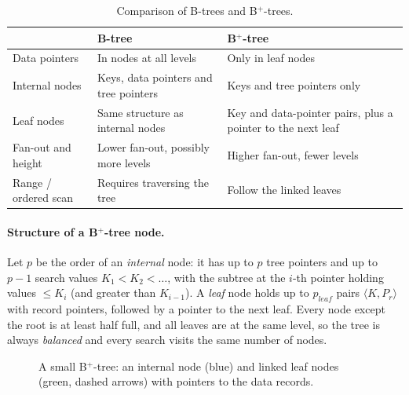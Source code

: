 \begin{table}[H]
\centering
\small
\begin{tabularx}{\textwidth}{@{}l>{\raggedright\arraybackslash}X>{\raggedright\arraybackslash}X@{}}
\toprule
 & \textbf{B-tree} & \textbf{B$^+$-tree} \\
\midrule
Data pointers & In nodes at all levels & Only in leaf nodes \\
Internal nodes & Keys, data pointers and tree pointers & Keys and tree pointers only \\
Leaf nodes & Same structure as internal nodes & Key and data-pointer pairs, plus a pointer to the next leaf \\
Fan-out and height & Lower fan-out, possibly more levels & Higher fan-out, fewer levels \\
Range / ordered scan & Requires traversing the tree & Follow the linked leaves \\
\bottomrule
\end{tabularx}
\caption{Comparison of B-trees and B$^+$-trees.}
\label{tab:btree-vs-bplus}
\end{table}

\paragraph{Structure of a B$^+$-tree node.}
Let $p$ be the order of an \emph{internal} node: it has up to $p$ tree pointers and up to $p-1$
search values $K_1 < K_2 < \dots$, with the subtree at the $i$-th pointer holding values $\le K_i$
(and greater than $K_{i-1}$). A \emph{leaf} node holds up to $p_{leaf}$ pairs
$\langle K, P_r\rangle$ with record pointers, followed by a pointer to the next leaf. Every node
except the root is at least half full, and all leaves are at the same level, so the tree is always
\emph{balanced} and every search visits the same number of nodes.

\begin{figure}[H]
\centering
{}
\caption{A small B$^+$-tree: an internal node (blue) and linked leaf nodes (green, dashed arrows) with pointers to the data records.}
\label{fig:bplus}
\end{figure}

